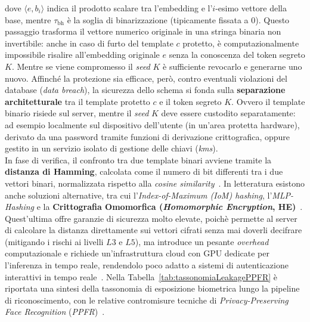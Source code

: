 dove $\langle e, b_i \rangle$ indica il prodotto scalare tra l'embedding e l'$i$-esimo vettore della base, mentre $\tau_{\text{bh}}$ è la soglia di binarizzazione (tipicamente fissata a $0$). 
Questo passaggio trasforma il vettore numerico originale in una stringa binaria non invertibile: anche in caso di furto del template $c$ protetto, è computazionalmente impossibile risalire all'embedding originale $e$ senza la conoscenza del token segreto $K$. Mentre se viene compromesso il \textit{seed} $K$ è sufficiente revocarlo e generarne uno nuovo. 
Affinché la protezione sia efficace, però, contro eventuali violazioni del database (\textit{data breach}), la sicurezza dello schema si fonda sulla \textbf{separazione architetturale} tra il template protetto $c$ e il token segreto $K$. 
Ovvero il template binario risiede sul server, mentre il \textit{seed} $K$ deve essere custodito separatamente: ad esempio localmente sul dispositivo dell'utente (in un'area protetta hardware), derivato da una password tramite funzioni di derivazione crittografica, oppure gestito in un servizio isolato di gestione delle chiavi (\textit{\gls{kms}}).
\\In fase di verifica, il confronto tra due template binari avviene tramite la \textbf{distanza di Hamming}, calcolata come il numero di bit differenti tra i due vettori binari, normalizzata rispetto alla \textit{cosine similarity}~\cite{otroshishahrezaBenchmarkingCancelableBiometrics2022}.
In letteratura esistono anche soluzioni alternative, tra cui l'\textit{Index-of-Maximum (IoM) hashing}, l'\textit{MLP-Hashing} e la \textbf{Crittografia Omomorfica (\textit{Homomorphic Encryption}, HE)}~\cite{otroshishahrezaBenchmarkingCancelableBiometrics2022}.
Quest'ultima offre garanzie di sicurezza molto elevate, poichè permette al server di calcolare la distanza direttamente sui vettori cifrati senza mai doverli decifrare (mitigando i rischi ai livelli $L3$ e $L5$), ma introduce un pesante \textit{overhead} computazionale e richiede un'infrastruttura cloud con GPU dedicate per l'inferenza in tempo reale, rendendolo poco adatto a sistemi di autenticazione interattivi in tempo reale~\cite{otroshishahrezaBenchmarkingCancelableBiometrics2022}.
Nella Tabella~\ref{tab:tassonomiaLeakagePPFR} è riportata una sintesi della tassonomia di esposizione biometrica lungo la pipeline di riconoscimento, con le relative contromisure tecniche di \textit{Privacy-Preserving Face Recognition} (\textit{PPFR})~\cite{sanzGoverningPrivacyPreservingFace2026,otroshishahrezaBenchmarkingCancelableBiometrics2022,groupBiometricLivenessPresentation}.

